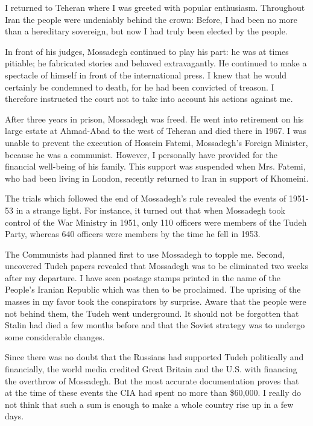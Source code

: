 I returned to Teheran where I was greeted with popular enthusiasm. Throughout Iran the people were undeniably behind the crown: Before, I had been no more than a hereditary sovereign, but now I had truly been elected by the people. 

In front of his judges, Mossadegh continued to play his part: he was at times pitiable; he fabricated stories and behaved extravagantly. He continued to make a spectacle of himself in front of the international press. I knew that he would certainly be condemned to death, for he had been convicted of treason. I therefore instructed the court not to take into account his actions against me. 

After three years in prison, Mossadegh was freed. He went into retirement on his large estate at Ahmad-Abad to the west of Teheran and died there in 1967. I was unable to prevent the execution of Hossein Fatemi, Mossadegh’s Foreign Minister, because he was a communist. However, I personally have provided for the financial well-being of his family. This support was suspended when Mrs. Fatemi, who had been living in London, recently returned to Iran in support of Khomeini. 

The trials which followed the end of Mossadegh’s rule revealed the events of 1951-53 in a strange light. For instance, it turned out that when Mossadegh took control of the War Ministry in 1951, only 110 officers were members of the Tudeh Party, whereas 640 officers were members by the time he fell in 1953. 

The Communists had planned first to use Mossadegh to topple me. Second, uncovered Tudeh papers revealed that Mossadegh was to be eliminated two weeks after my departure. I have seen postage stamps printed in the name of the People’s Iranian Republic which was then to be proclaimed. The uprising of the masses in my favor took the conspirators by surprise. Aware that the people were not behind them, the Tudeh went underground. It should not be forgotten that Stalin had died a few months before and that the Soviet strategy was to undergo some considerable changes. 

Since there was no doubt that the Russians had supported Tudeh politically and financially, the world media credited Great Britain and the U.S. with financing the overthrow of Mossadegh. But the most accurate documentation proves that at the time of these events the CIA had spent no more than \$60,000. I really do not think that such a sum is enough to make a whole country rise up in a few days. 

